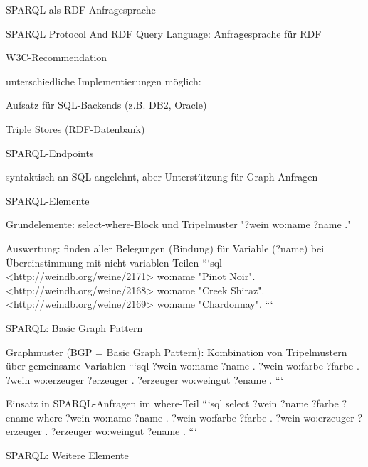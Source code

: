 \documentclass[a4paper]{article}
\begin{document}
\begin{multicols}{3}
\begin{itemize*}
    SPARQL als RDF-Anfragesprache
    \begin{itemize*}
        \item SPARQL Protocol And RDF Query Language: Anfragesprache für RDF
        \item W3C-Recommendation
        \item unterschiedliche Implementierungen möglich:
        \begin{itemize*}
            \item Aufsatz für SQL-Backends (z.B. DB2, Oracle)
            \item Triple Stores (RDF-Datenbank)
            \item SPARQL-Endpoints
        \end{itemize*}
        \item syntaktisch an SQL angelehnt, aber Unterstützung für Graph-Anfragen
        \item SPARQL-Elemente
        \begin{itemize*}
            \item Grundelemente: select-where-Block und Tripelmuster "?wein wo:name ?name ."
            \item Auswertung: finden aller Belegungen (Bindung) für Variable (?name) bei Übereinstimmung mit nicht-variablen Teilen
            ```sql
            <http://weindb.org/weine/2171> wo:name "Pinot Noir".
            <http://weindb.org/weine/2168> wo:name "Creek Shiraz".
            <http://weindb.org/weine/2169> wo:name "Chardonnay".
            ```
        \end{itemize*}
        \item SPARQL: Basic Graph Pattern
        \begin{itemize*}
            \item Graphmuster (BGP = Basic Graph Pattern): Kombination von Tripelmustern über gemeinsame Variablen
            ```sql
            ?wein wo:name ?name .
            ?wein wo:farbe ?farbe .
            ?wein wo:erzeuger ?erzeuger .
            ?erzeuger wo:weingut ?ename .
            ```
            \item Einsatz in SPARQL-Anfragen im where-Teil
            ```sql
            select ?wein ?name ?farbe ?ename
            where { ?wein wo:name ?name .
                    ?wein wo:farbe ?farbe .
                    ?wein wo:erzeuger ?erzeuger .
                    ?erzeuger wo:weingut ?ename . }
            ```
        \end{itemize*}
        \item SPARQL: Weitere Elemente

\end{itemize*}
\end{itemize*}
\end{multicols}
\end{document}
